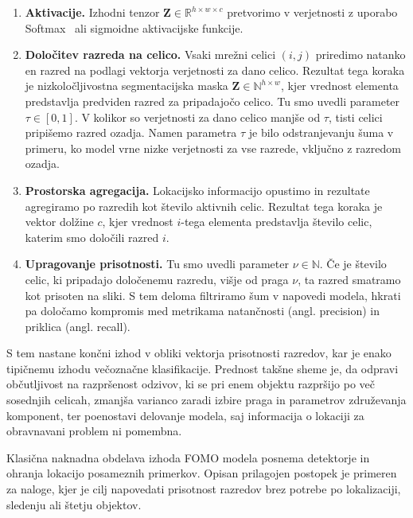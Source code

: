 \documentclass[a4paper,twoside,openright,12pt,slovene]{book}
\begin{document}
            \begin{enumerate}
                \item \textbf{Aktivacije.} Izhodni tenzor $\mathbf{Z} \in \mathbb{R}^{h\times w\times c}$ pretvorimo v verjetnosti z uporabo Softmax~\cite{bridle1990probabilistic-softmax} ali sigmoidne aktivacijske funkcije.
                \item \textbf{Določitev razreda na celico.} Vsaki mrežni celici $(i,j)$ priredimo natanko en razred na podlagi vektorja verjetnosti za dano celico. Rezultat tega koraka je nizkoločljivostna segmentacijska maska $\mathbf{Z} \in \mathbb{N}^{h\times w}$, kjer vrednost elementa predstavlja predviden razred za pripadajočo celico. Tu smo uvedli parameter $\tau \in [0, 1]$. V kolikor so verjetnosti za dano celico manjše od $\tau$, tisti celici pripišemo razred ozadja.
                Namen parametra $\tau$ je bilo odstranjevanju šuma v primeru, ko model vrne nizke verjetnosti za vse razrede, vključno z razredom ozadja.
                \item \textbf{Prostorska agregacija.} Lokacijsko informacijo opustimo in rezultate agregiramo po razredih kot število aktivnih celic. Rezultat tega koraka je vektor dolžine $c$, kjer vrednost $i$-tega elementa predstavlja število celic, katerim smo določili razred $i$.
                \item \textbf{Upragovanje prisotnosti.} Tu smo uvedli parameter $\nu \in \mathbb{N}$. Če je število celic, ki pripadajo določenemu razredu, višje od praga $\nu$, ta razred smatramo kot prisoten na sliki.
                    S tem deloma filtriramo šum v napovedi modela, hkrati pa določamo kompromis med metrikama natančnosti (angl. precision) in priklica (angl. recall).
            \end{enumerate}

            S tem nastane končni izhod v obliki vektorja prisotnosti razredov, kar je enako tipičnemu izhodu večoznačne klasifikacije. Prednost takšne sheme je, da odpravi občutljivost na razpršenost odzivov, ki se pri enem objektu razpršijo po več sosednjih celicah, zmanjša varianco zaradi izbire praga in parametrov združevanja komponent, ter poenostavi delovanje modela, saj informacija o lokaciji za obravnavani problem ni pomembna.

            Klasična naknadna obdelava izhoda FOMO modela posnema detektorje in ohranja lokacijo posameznih primerkov. Opisan prilagojen postopek je primeren za naloge, kjer je cilj napovedati prisotnost razredov brez potrebe po lokalizaciji, sledenju ali štetju objektov.
\end{document}
